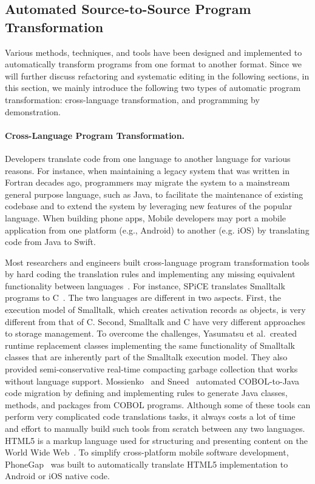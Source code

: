 \subsection{Automated Source-to-Source Program Transformation}
\label{sec:automated}

Various methods, techniques, and tools have been designed and implemented to automatically transform programs from one format to another format. Since we will further discuss refactoring and systematic editing in the following sections, in this section, we mainly introduce the following two types of automatic program transformation: cross-language transformation, and programming by demonstration.


\paragraph*{Cross-Language Program Transformation.}
Developers translate code from one language to another language for various reasons. For instance, when maintaining a legacy system that was written in Fortran decades ago, programmers may migrate the system to a mainstream general purpose language, such as Java, to facilitate the maintenance of existing codebase and to extend the system by leveraging new features of the popular language. When building phone apps, Mobile developers may port a mobile application from one platform (e.g., Android) to another (e.g. iOS) by translating code from Java to Swift. 

Most researchers and engineers built cross-language program transformation tools by hard coding the translation rules and implementing any missing equivalent functionality between languages~\cite{Yasumatsu:95,Mossienko:03,Sneed:2010,jovial2c,cobol2java}. For instance, SPiCE translates Smalltalk programs to C~\cite{Yasumatsu:95}. The two languages are different in two aspects. First, the execution model of Smalltalk, which creates activation records as objects, is very different from that of C. Second, Smalltalk and C have very different approaches to storage management. To overcome the challenges, Yasumatsu et al.~created runtime replacement classes implementing the same functionality of Smalltalk classes that are inherently part of the Smalltalk execution model. They also provided semi-conservative real-time compacting garbage collection that works without language support.
Mossienko~\cite{Mossienko:03} and Sneed~\cite{Sneed:2010} automated COBOL-to-Java code migration by defining and implementing rules to generate Java classes, methods, and packages from COBOL programs. Although some of these tools can perform very complicated code translations tasks, it always costs a lot of time and effort to manually build such tools from scratch between any two languages. HTML5 is a markup language used for structuring and presenting content on the World Wide Web~\cite{html5}. To simplify cross-platform mobile software development, PhoneGap~\cite{phonegap} was built to automatically translate HTML5 implementation to Android or iOS native code.


